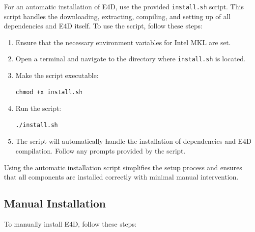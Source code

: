 \documentclass[a4paper,12pt]{article}
\begin{document}
For an automatic installation of E4D, use the provided \texttt{install.sh}
script. This script handles the downloading, extracting, compiling, and setting
up of all dependencies and E4D itself. To use the script, follow these steps:

\begin{enumerate}
    \item Ensure that the necessary environment variables for Intel MKL are set.
    \item Open a terminal and navigate to the directory where \texttt{install.sh} is
          located.
    \item Make the script executable: \begin{verbatim}
chmod +x install.sh \end{verbatim}
    \item Run the script: \begin{verbatim}
./install.sh   \end{verbatim}
    \item The script will automatically handle the installation of dependencies and E4D
          compilation. Follow any prompts provided by the script.
\end{enumerate}

Using the automatic installation script simplifies the setup process and
ensures that all components are installed correctly with minimal manual
intervention.

\subsection{Manual Installation}

To manually install E4D, follow these steps:
\end{document}
